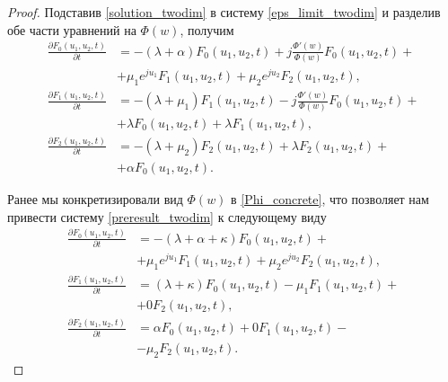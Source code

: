 \begin{proof}
	Подставив \eqref{solution_twodim} в систему \eqref{eps_limit_twodim} и разделив обе части уравнений на $\Phi(w)$, получим
	\begin{equation} \label{preresult_twodim}
		\begin{split}
			\frac{{\partial F_{0}(u_{1},u_{2},t)}}{{\partial t}} &= -(\lambda + \alpha)F_{0}(u_{1},u_{2},t) + j
			\frac{\Phi'(w) }{\Phi(w)}F_{0}(u_{1},u_{2},t) +\\  &+ \mu_{1} e^{ju_{1}}F_{1}(u_{1},u_{2},t) + \mu_{2}e^{ju_{2}}F_{2}(u_{1},u_{2},t) ,
			\\
			\frac{{\partial F_{1}(u_{1},u_{2},t)}}{{\partial t}} &= -(\lambda + \mu_{1})F_{1}(u_{1},u_{2},t) - j 
			\frac{\Phi'(w) }{\Phi(w)}F_{0}(u_{1},u_{2},t) +\\  &+ \lambda F_{0}(u_{1},u_{2},t) + \lambda F_{1}(u_{1},u_{2},t) ,
			\\
			\frac{{\partial F_{2}(u_{1},u_{2},t)}}{{\partial t}} &= -(\lambda + \mu_{2})F_{2}(u_{1},u_{2},t)  + \lambda F_{2}(u_{1},u_{2},t) +\\  &+ \alpha F_{0}(u_{1},u_{2},t).
		\end{split}
	\end{equation}  

	Ранее мы конкретизировали вид $\Phi(w)$ в \eqref{Phi_concrete}, что позволяет нам привести систему \eqref{preresult_twodim} к следующему виду	
	\begin{equation} \label{result_twodim}
		\begin{split}
			\frac{{\partial F_{0}(u_{1},u_{2},t)}}{{\partial t}} &= -(\lambda + \alpha+ \kappa)F_{0}(u_{1},u_{2},t) + \\  &+ \mu_{1} e^{ju_{1}}F_{1}(u_{1},u_{2},t) + \mu_{2}e^{ju_{2}}F_{2}(u_{1},u_{2},t) ,
			\\
			\frac{{\partial F_{1}(u_{1},u_{2},t)}}{{\partial t}} &= (\lambda + \kappa)F_{0}(u_{1},u_{2},t) -  
			\mu_{1}F_{1}(u_{1},u_{2},t) +\\  &+  0F_{2}(u_{1},u_{2},t) ,
			\\
			\frac{{\partial F_{2}(u_{1},u_{2},t)}}{{\partial t}} &= \alpha F_{0}(u_{1},u_{2},t)   +  0F_{1}(u_{1},u_{2},t) -\\  &- \mu_{2}F_{2}(u_{1},u_{2},t).
		\end{split}
	\end{equation}  


\end{proof}
